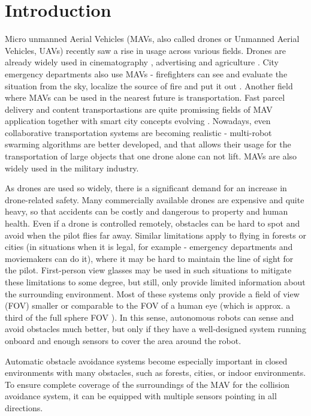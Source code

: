 \chapter{Introduction}

\label{chapter:intro}

Micro unmanned Aerial Vehicles (MAVs, also called drones or Unmanned Aerial Vehicles, UAVs) recently saw a rise in usage across various fields. 
Drones are already widely used in cinematography \cite{Mademlis2020}, advertising \cite{Ullah2021} and agriculture \cite{Kim2019}. 
City emergency departments also use MAVs - firefighters can see and evaluate the situation from the sky, localize the source of fire and put it out \cite{Pritzl2021}.
Another field where MAVs can be used in the nearest future is transportation. 
Fast parcel delivery \cite{She2021} and content transportastions \cite{Gupta2021,Aloqaily2022} are quite promissing fields of MAV application together with smart city concepts evolving \cite{Ortiz2019}.
Nowadays, even collaborative transportation systems are becoming realistic - multi-robot swarming algorithms are better developed, and that allows their usage for the transportation of large objects \cite{Bacelar2020} that one drone alone can not lift. 
MAVs are also widely used in the military industry.

As drones are used so widely, there is a significant demand for an increase in drone-related safety. 
Many commercially available drones are expensive and quite heavy, so that accidents can be costly and dangerous to property and human health. 
Even if a drone is controlled remotely, obstacles can be hard to spot and avoid when the pilot flies far away.
Similar limitations apply to flying in forests or cities (in situations when it is legal, for example - emergency departments and moviemakers can do it), where it may be hard to maintain the line of sight for the pilot.
First-person view glasses may be used in such situations to mitigate these limitations to some degree, but still, only provide limited information about the surrounding environment.
Most of these systems only provide a field of view (FOV) smaller or comparable to the FOV of a human eye (which is approx. a third of the full sphere FOV \cite{humeye}).
In this sense, autonomous robots can sense and avoid obstacles much better, but only if they have a well-designed system running onboard and enough sensors to cover the area around the robot.

Automatic obstacle avoidance systems become especially important in closed environments with many obstacles, such as forests, cities, or indoor environments.
To ensure complete coverage of the surroundings of the MAV for the collision avoidance system, it can be equipped with multiple sensors pointing in all directions.

